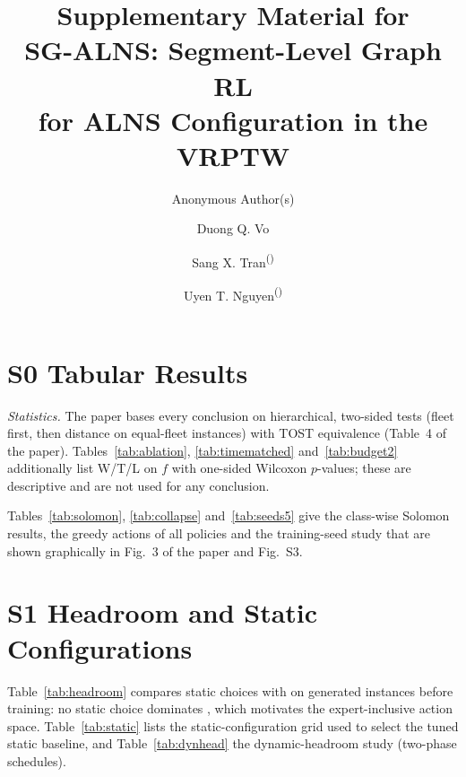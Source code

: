 \documentclass[runningheads]{llncs}
\begin{document}
\title{Supplementary Material for\\ SG-ALNS: Segment-Level Graph RL\\ for ALNS Configuration in the VRPTW}
\ifanonymous
  \author{Anonymous Author(s)}
\else
  \author{Duong Q. Vo \and Sang X. Tran\textsuperscript{(\Letter)} \and Uyen T. Nguyen\textsuperscript{(\Letter)}}
\fi
\maketitle




\section*{S0 Tabular Results}
\emph{Statistics.} The paper bases every conclusion on hierarchical, two-sided tests (fleet first, then distance on
equal-fleet instances) with TOST equivalence (Table~4 of the paper). Tables~\ref{tab:ablation},
\ref{tab:timematched} and~\ref{tab:budget2} additionally list W/T/L on $f$ with one-sided Wilcoxon $p$-values; these
are descriptive and are not used for any conclusion.

Tables~\ref{tab:solomon}, \ref{tab:collapse} and~\ref{tab:seeds5} give the class-wise Solomon results, the greedy
actions of all policies and the training-seed study that are shown graphically in Fig.~3 of the paper and Fig.~S3.




\section*{S1 Headroom and Static Configurations}
Table~\ref{tab:headroom} compares static choices with \Rw{} on generated instances before training: no static choice
dominates \Rw{}, which motivates the expert-inclusive action space. Table~\ref{tab:static} lists the
static-configuration grid used to select the tuned static baseline, and Table~\ref{tab:dynhead} the dynamic-headroom
study (two-phase schedules).



\end{document}

